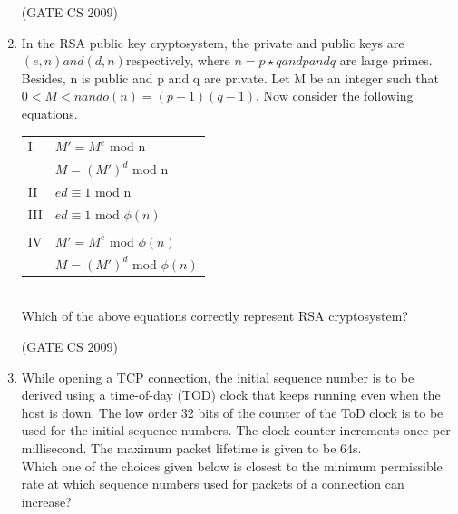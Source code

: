 \documentclass[a4paper, 11pt]{article}
\begin{document}
\begin{enumerate}
    \hfill (GATE CS 2009)

    \item In the RSA public key cryptosystem, the private and public keys are $(e, n) and (d, n)$respectively, where $n=p\star q and p and q$ are large primes. Besides, n is public and p and q are private. Let M be an integer such that $0<M<n and o(n)=(p-1)(q-1)$. Now consider the following equations.\\
    \begin{tabular}{ll}
        I & $M' = M^e$  mod n\\
         & $M = (M')^d$ mod n\\
        II & $ed \equiv 1 $ mod n\\
        III & $ed \equiv 1 $ mod $\phi(n)$\\ \\
        IV & $M' = M^e$  mod $\phi(n)$\\
           & $M = (M')^d$  mod $\phi(n)$\\
    \end{tabular}\\
    Which of the above equations correctly represent RSA cryptosystem?\\

    \begin{enumerate}
    \end{enumerate}

    \hfill (GATE CS 2009)
    
     \item While opening a TCP connection, the initial sequence number is to be derived using a time-of-day (TOD) clock that keeps running even when the host is down. The low order 32 bits of the counter of the ToD clock is to be used for the initial sequence numbers. The clock counter increments once per millisecond. The maximum packet lifetime is given to be 64s.\\
    Which one of the choices given below is closest to the minimum permissible rate at which sequence numbers used for packets of a connection can increase?\\
    \begin{enumerate}
    \end{enumerate}
    

\end{enumerate}
\end{document}
